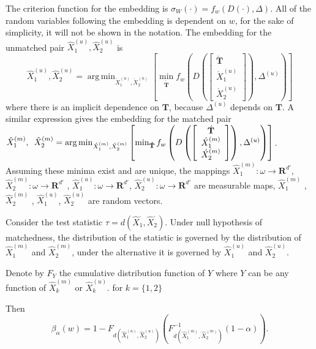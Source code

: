 \documentclass[11pt]{article} %
\DeclareMathOperator*{\argmin}{arg\,min}
\begin{document}
 The criterion function for the embedding is $\sigma_W(\cdot) =f_w(D({\cdot}),\Delta)$. All of the random variables following the embedding is dependent on $w$, for the sake of simplicity, it will not be shown in the notation. The embedding for the unmatched pair ${\hat{X}_{1}^{(u)},\hat{X}_{2}^{(u)}}$  is 
 \[
{\hat{X}_{1}^{(u)},\hat{X}_{2}^{(u)}}
=\argmin_{\acute{X}_{1}^{(u)}, \acute{X}_{2}^{(u)}}\left[\min_{\mathbf{\acute{T}}}
{f_w\left(
D\left(
\left[
\begin{array}{c}
\acute{\mathbf{T}} \\
\acute{X}_{1}^{(u)} \\
\acute{X}_{2}^{(u)}
\end {array}
\right]
\right),
\Delta^{(u)}
\right)
}
\right]
\]
where there is an implicit dependence on $\mathbf{T}$, because $\Delta^{(u)}$ depends on $\mathbf{T}$. 
A similar expression gives the embedding for the matched pair  
${\hat{X}_{1}^{(m)},\hspace{0.5em}\hat{X}_{2}^{(m)}}=\argmin_{\acute{X}_{1}^{(m)}, \acute{X}_{2}^{(m)}}\left[\min_{\mathbf{\acute{T}}}
{f_w\left(
D\left(
\left[
\begin{array}{c}
\acute{\mathbf{T}} \\
\acute{X}_{1}^{(m)} \\
\acute{X}_{2}^{(m)}
\end {array}
\right]
\right),
\Delta^{(u)}
\right)
}
\right]$.
 Assuming these minima exist and are unique, the mappings $\hat{X}_{1}^{(m)}:\omega\rightarrow \mathbf{R}^{d'}$,  $\hat{X}_{2}^{(m)}:\omega\rightarrow \mathbf{R}^{d'}$ , $\hat{X}_{1}^{(u)}:\omega\rightarrow \mathbf{R}^{d'}$, 
$\hat{X}_{2}^{(u)}:\omega\rightarrow \mathbf{R}^{d'}$ are  measurable maps,  $\hat{X}_{1}^{(m)}$ , $\hat{X}_{2}^{(m)}$ , $\hat{X}_{1}^{(u)}$, $\hat{X}_{2}^{(u)}$ are random vectors. 

Consider the test statistic $\tau=d(\hat{X}_{1}^{\cdot},\hat{X}_{2}^{\cdot})$. Under null hypothesis of matchedness, the distribution of the statistic is governed by the distribution of $\hat{X}_{1}^{(m)}$ and $\hat{X}_{2}^{(m)}$, under the alternative it is governed by  $\hat{X}_{1}^{(u)}$ and $\hat{X}_{2}^{(u)}$.

Denote by $F_Y$ the   cumulative distribution function of  $Y$ where $Y$ can be  any function of $\hat{X}_{k}^{(m)}$ or $\hat{X}_{k}^{(u)}$.  for $k=\{1,2\}$ 



 Then $$\beta_{\alpha}\left( w\right)=1-F_{d \left(\hat{X}_{1}^{(u)},\hat{X}_{2}^{(u)}\right)}(F_{d\left(\hat{X}_{1}^{(m)},\hat{X}_{2}^{(m)}\right)}^{-1}(1-\alpha)).$$
\end{document}
